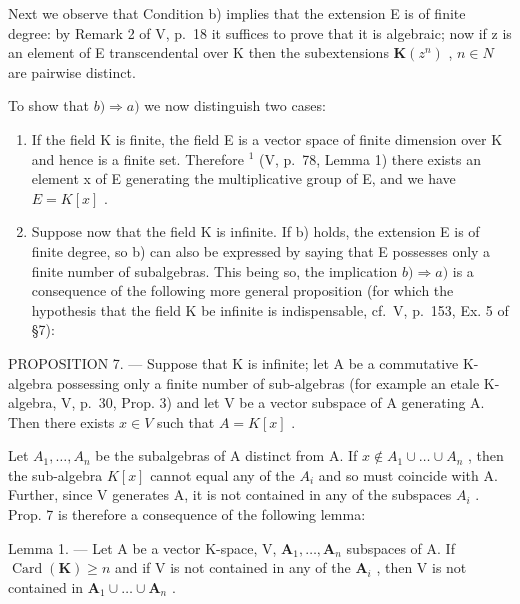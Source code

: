 Next we observe that Condition b) implies that the extension E is of finite degree: by Remark 2 of V, p.~18 it suffices to prove that it is algebraic; now if z is an element of E transcendental over K then the subextensions \(\mathbf{K}(z^{n})\) , \(n \in N\) are pairwise distinct.

To show that \(b) \Rightarrow a)\) we now distinguish two cases:

\begin{enumerate}
\def\labelenumi{\Alph{enumi})}
\item
  If the field K is finite, the field E is a vector space of finite dimension over K and hence is a finite set. Therefore \({}^{1}\) (V, p.~78, Lemma 1) there exists an element x of E generating the multiplicative group of E, and we have \(E = K[x]\) .
\item
  Suppose now that the field K is infinite. If b) holds, the extension E is of finite degree, so b) can also be expressed by saying that E possesses only a finite number of subalgebras. This being so, the implication \(b) \Rightarrow a)\) is a consequence of the following more general proposition (for which the hypothesis that the field K be infinite is indispensable, cf.~V, p.~153, Ex. 5 of §7):
\end{enumerate}

PROPOSITION 7. --- Suppose that K is infinite; let A be a commutative K-algebra possessing only a finite number of sub-algebras (for example an etale K-algebra, V, p.~30, Prop. 3) and let V be a vector subspace of A generating A. Then there exists \(x \in V\) such that \(A = K[x]\) .

Let \(A_{1}, \ldots, A_{n}\) be the subalgebras of A distinct from A. If \(x \notin A_{1} \cup \ldots \cup A_{n}\) , then the sub-algebra \(K[x]\) cannot equal any of the \(A_{i}\) and so must coincide with A. Further, since V generates A, it is not contained in any of the subspaces \(A_{i}\) . Prop. 7 is therefore a consequence of the following lemma:

Lemma 1. --- Let A be a vector K-space, V, \(\mathbf{A}_1, \ldots, \mathbf{A}_n\) subspaces of A. If \(\operatorname{Card}(\mathbf{K}) \geqslant n\) and if V is not contained in any of the \(\mathbf{A}_i\) , then V is not contained in \(\mathbf{A}_1 \cup \ldots \cup \mathbf{A}_n\) .

